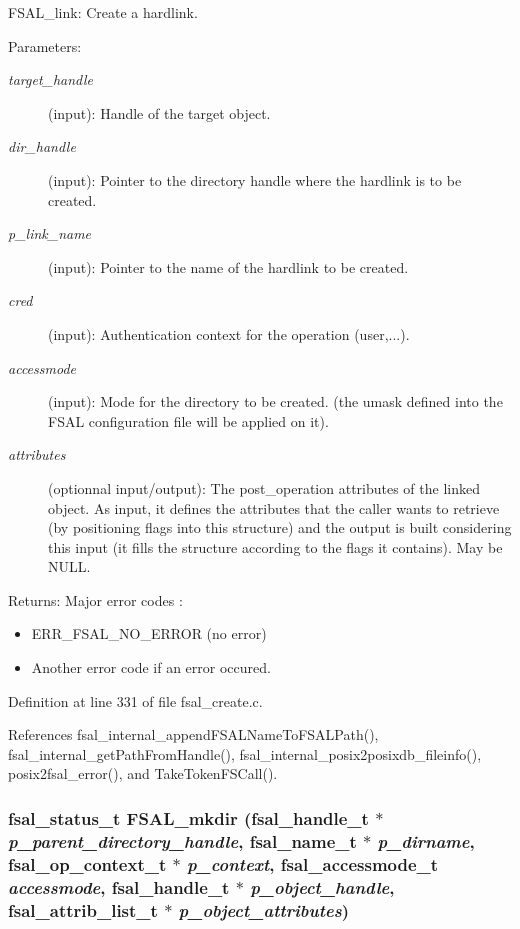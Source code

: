 FSAL\_\-link: Create a hardlink.

\begin{Desc}
\item[Parameters:]
\begin{description}
\item[{\em target\_\-handle}](input): Handle of the target object. \item[{\em dir\_\-handle}](input): Pointer to the directory handle where the hardlink is to be created. \item[{\em p\_\-link\_\-name}](input): Pointer to the name of the hardlink to be created. \item[{\em cred}](input): Authentication context for the operation (user,...). \item[{\em accessmode}](input): Mode for the directory to be created. (the umask defined into the FSAL configuration file will be applied on it). \item[{\em attributes}](optionnal input/output): The post\_\-operation attributes of the linked object. As input, it defines the attributes that the caller wants to retrieve (by positioning flags into this structure) and the output is built considering this input (it fills the structure according to the flags it contains). May be NULL.\end{description}
\end{Desc}
\begin{Desc}
\item[Returns:]Major error codes :\begin{itemize}
\item ERR\_\-FSAL\_\-NO\_\-ERROR (no error)\item Another error code if an error occured. \end{itemize}
\end{Desc}


Definition at line 331 of file fsal\_\-create.c.

References fsal\_\-internal\_\-append\-FSALName\-To\-FSALPath(), fsal\_\-internal\_\-get\-Path\-From\-Handle(), fsal\_\-internal\_\-posix2posixdb\_\-fileinfo(), posix2fsal\_\-error(), and Take\-Token\-FSCall().
\subsubsection{\setlength{\rightskip}{0pt plus 5cm}fsal\_\-status\_\-t FSAL\_\-mkdir (fsal\_\-handle\_\-t $\ast$ {\em p\_\-parent\_\-directory\_\-handle}, fsal\_\-name\_\-t $\ast$ {\em p\_\-dirname}, fsal\_\-op\_\-context\_\-t $\ast$ {\em p\_\-context}, fsal\_\-accessmode\_\-t {\em accessmode}, fsal\_\-handle\_\-t $\ast$ {\em p\_\-object\_\-handle}, fsal\_\-attrib\_\-list\_\-t $\ast$ {\em p\_\-object\_\-attributes})}\label{fsal__create_8c_a1}


